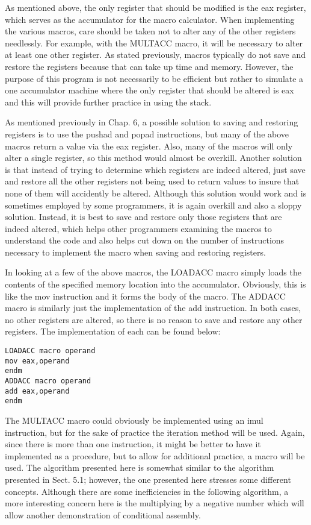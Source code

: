\documentclass[10pt]{article}
\begin{document}
As mentioned above, the only register that should be modified is the eax register, which serves as the accumulator for the macro calculator. When implementing the various macros, care should be taken not to alter any of the other registers needlessly. For example, with the MULTACC macro, it will be necessary to alter at least one other register. As stated previously, macros typically do not save and restore the registers because that can take up time and memory. However, the purpose of this program is not necessarily to be efficient but rather to simulate a one accumulator machine where the only register that should be altered is eax and this will provide further practice in using the stack.

As mentioned previously in Chap. 6, a possible solution to saving and restoring registers is to use the pushad and popad instructions, but many of the above macros return a value via the eax register. Also, many of the macros will only alter a single register, so this method would almost be overkill. Another solution is that instead of trying to determine which registers are indeed altered, just save and restore all the other registers not being used to return values to insure that none of them will accidently be altered. Although this solution would work and is sometimes employed by some programmers, it is again overkill and also a sloppy solution. Instead, it is best to save and restore only those registers that are indeed altered, which helps other programmers examining the macros to understand the code and also helps cut down on the number of instructions necessary to implement the macro when saving and restoring registers.

In looking at a few of the above macros, the LOADACC macro simply loads the contents of the specified memory location into the accumulator. Obviously, this is like the mov instruction and it forms the body of the macro. The ADDACC macro is similarly just the implementation of the add instruction. In both cases, no other registers are altered, so there is no reason to save and restore any other registers. The implementation of each can be found below:

\begin{verbatim}
LOADACC macro operand
mov eax,operand
endm
ADDACC macro operand
add eax,operand
endm
\end{verbatim}

The MULTACC macro could obviously be implemented using an imul instruction, but for the sake of practice the iteration method will be used. Again, since there is more than one instruction, it might be better to have it implemented as a procedure, but to allow for additional practice, a macro will be used. The algorithm presented here is somewhat similar to the algorithm presented in Sect. 5.1; however, the one presented here stresses some different concepts. Although there are some inefficiencies in the following algorithm, a more interesting concern here is the multiplying by a negative number which will allow another demonstration of conditional assembly.
\end{document}
